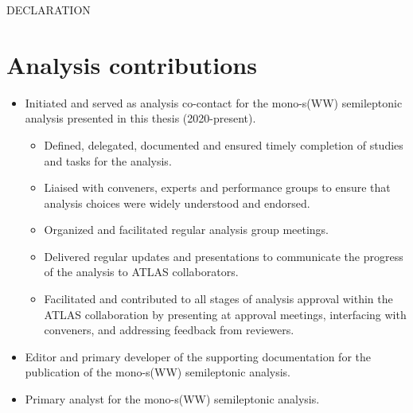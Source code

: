 
\begin{center}
DECLARATION
\end{center}

\section*{Analysis contributions}

\begin{itemize}
\item Initiated and served as analysis co-contact for the mono-s(WW) semileptonic analysis presented in this thesis (2020-present).
\begin{small}
\begin{itemize}
\item Defined, delegated, documented and ensured timely completion of studies and tasks for the analysis.
\item Liaised with conveners, experts and performance groups to ensure that analysis choices were widely understood and endorsed.
\item Organized and facilitated regular analysis group meetings.
\item Delivered regular updates and presentations to communicate the progress of the analysis to ATLAS collaborators. 
\item Facilitated and contributed to all stages of analysis approval within the ATLAS collaboration by presenting at approval meetings, interfacing with conveners, and addressing feedback from reviewers.
\end{itemize}
\end{small}
\item Editor and primary developer of the supporting documentation for the publication of the mono-s(WW) semileptonic analysis.
\item Primary analyst for the mono-s(WW) semileptonic analysis.
\begin{itemize}
\end{itemize}
\end{itemize}

